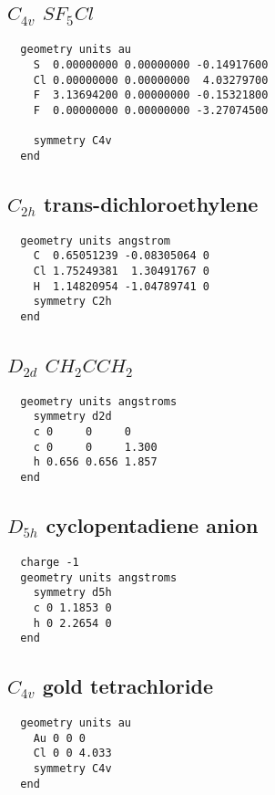   \subsection{\protect$C_{4v}$ \protect$SF_5Cl$}

\begin{verbatim}
  geometry units au
    S  0.00000000 0.00000000 -0.14917600 
    Cl 0.00000000 0.00000000  4.03279700 
    F  3.13694200 0.00000000 -0.15321800 
    F  0.00000000 0.00000000 -3.27074500 

    symmetry C4v
  end
\end{verbatim}

  \subsection{\protect$C_{2h}$ trans-dichloroethylene}
\begin{verbatim}
  geometry units angstrom
    C  0.65051239 -0.08305064 0 
    Cl 1.75249381  1.30491767 0 
    H  1.14820954 -1.04789741 0 
    symmetry C2h
  end
\end{verbatim}

  \subsection{\protect$D_{2d}$ \protect$CH_2CCH_2$}
\begin{verbatim}
  geometry units angstroms
    symmetry d2d
    c 0     0     0 
    c 0     0     1.300 
    h 0.656 0.656 1.857 
  end
\end{verbatim}

  \subsection{\protect$D_{5h}$ cyclopentadiene anion}
\begin{verbatim}
  charge -1
  geometry units angstroms
    symmetry d5h
    c 0 1.1853 0 
    h 0 2.2654 0 
  end
\end{verbatim}


  \subsection{\protect$C_{4v}$ gold tetrachloride}

\begin{verbatim}
  geometry units au
    Au 0 0 0 
    Cl 0 0 4.033
    symmetry C4v
  end
\end{verbatim}

